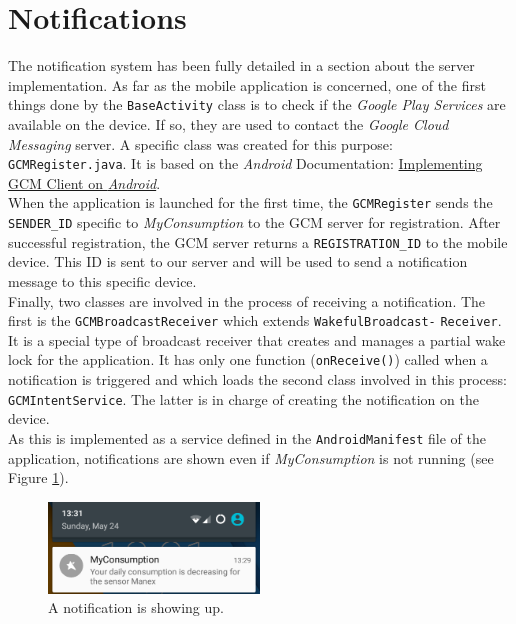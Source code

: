 \documentclass[a4paper, oneside, 11pt]{book}
\begin{document}
\section{Notifications}
The notification system has been fully detailed in a section about the server implementation. As far as the mobile application is concerned, one of the first things done by the \texttt{BaseActivity} class is to check if the \textit{Google Play Services} are available on the device. If so, they are used to contact the \textit{Google Cloud Messaging} server. A specific class was created for this purpose: \texttt{GCMRegister.java}. It is based on the \textit{Android} Documentation: \href{https://developer.android.com/google/gcm/client.html}{Implementing GCM Client on \textit{Android}}. \\

When the application is launched for the first time, the \texttt{GCMRegister} sends the \texttt{SENDER\_ID} specific to \textit{MyConsumption} to the GCM server for registration. After successful registration, the GCM server returns a \texttt{REGISTRATION\_ID} to the mobile device. This ID is sent to our server and will be used to send a notification message to this specific device.\\

Finally, two classes are involved in the process of receiving a notification. The first is the \texttt{GCMBroadcastReceiver} which extends \texttt{WakefulBroadcast-} \verb!Receiver!. It is a special type of broadcast receiver that creates and manages a partial wake lock for the application. It has only one function (\texttt{onReceive()}) called when a notification is triggered and which loads the second class involved in this process: \texttt{GCMIntentService}.  The latter is in charge of creating the notification on the device.\\

As this is implemented as a service defined in the \texttt{AndroidManifest} file of the application, notifications are shown even if \textit{MyConsumption} is not running (see Figure \ref{fig:notif_device}).
 
\begin{figure}[htbp]
	\centerline{\includegraphics[width=0.5\textwidth]{notif_device.png}}
	\caption{A notification is showing up.}
	\label{fig:notif_device}
\end{figure}
\end{document}
